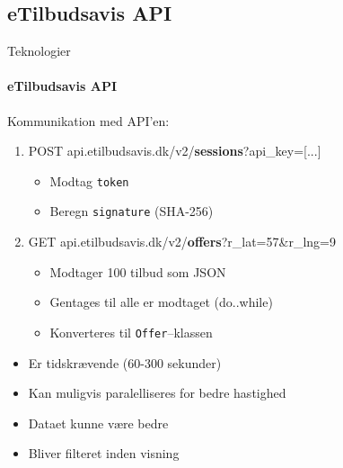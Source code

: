 		\subsection{eTilbudsavis API}
			\begin{frame}[t]{Teknologier} \framesubtitle{eTilbudsavis API}
			Kommunikation med API'en:
				\begin{enumerate}
					\item POST api.etilbudsavis.dk/v2/\textbf{sessions}?api\_key=[...]
					\begin{itemize}
						\item Modtag \texttt{token}
						\item Beregn \texttt{signature} (SHA-256)
					\end{itemize}
					\item GET api.etilbudsavis.dk/v2/\textbf{offers}?r\_lat=57\&r\_lng=9
					\begin{itemize}
						\item Modtager 100 tilbud som JSON
						\item Gentages til alle er modtaget (do..while)
						\item Konverteres til \texttt{Offer}--klassen
					\end{itemize}
				\end{enumerate}
				\begin{itemize}
					\item Er tidskrævende (60-300 sekunder)
					\item Kan muligvis paralelliseres for bedre hastighed
					\item Dataet kunne være bedre
					\item Bliver filteret inden visning
				\end{itemize}
			\end{frame}
